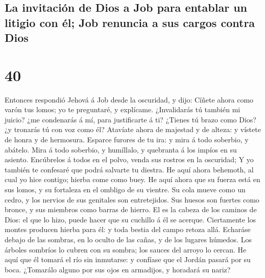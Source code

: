 \hypertarget{la-invitaciuxf3n-de-dios-a-job-para-entablar-un-litigio-con-uxe9l-job-renuncia-a-sus-cargos-contra-dios}{%
\subsection{La invitación de Dios a Job para entablar un litigio con él;
Job renuncia a sus cargos contra
Dios}\label{la-invitaciuxf3n-de-dios-a-job-para-entablar-un-litigio-con-uxe9l-job-renuncia-a-sus-cargos-contra-dios}}

\hypertarget{section-39}{%
\section{40}\label{section-39}}

 Entonces respondió Jehová á Job desde la oscuridad, y
dijo:  Cíñete ahora como varón tus lomos; yo te
preguntaré, y explícame.  ¿Invalidarás tú también mi
juicio? ¿me condenarás á mí, para justificarte á ti? 
¿Tienes tú brazo como Dios? ¿y tronarás tú con voz como él?
 Atavíate ahora de majestad y de alteza: y vístete de
honra y de hermosura.  Esparce furores de tu ira: y mira á
todo soberbio, y abátelo.  Mira á todo soberbio, y
humíllalo, y quebranta á los impíos en su asiento. 
Encúbrelos á todos en el polvo, venda sus rostros en la oscuridad;
 Y yo también te confesaré que podrá salvarte tu diestra.
 He aquí ahora behemoth, al cual yo hice contigo; hierba
come como buey.  He aquí ahora que su fuerza está en sus
lomos, y su fortaleza en el ombligo de su vientre.  Su
cola mueve como un cedro, y los nervios de sus genitales son
entretejidos.  Sus huesos son fuertes como bronce, y sus
miembros como barras de hierro.  El es la cabeza de los
caminos de Dios: el que lo hizo, puede hacer que su cuchillo á él se
acerque.  Ciertamente los montes producen hierba para él:
y toda bestia del campo retoza allá.  Echaráse debajo de
las sombras, en lo oculto de las cañas, y de los lugares húmedos.
 Los árboles sombríos lo cubren con su sombra; los sauces
del arroyo lo cercan.  He aquí que él tomará el río sin
inmutarse: y confíase que el Jordán pasará por su boca. 
¿Tomarálo alguno por sus ojos en armadijos, y horadará su nariz?
   

